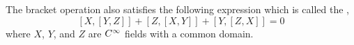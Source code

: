 \documentclass[../main]{subfiles}
\begin{document}
The bracket operation also satisfies the following expression which is called the , \renewcommand{\theequation}{Jacobi Identity}\begin{equation}\label{jacobi identity}
    [X,[Y, Z]]+[Z,[X, Y]]+[Y,[Z, X]]=0
\end{equation} where $X$, $Y$, and $Z$ are $C^\infty$ fields with a common domain.
\end{document}
